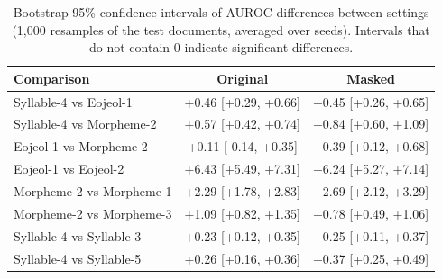 \begin{table}[t]
\centering
\small
\begin{tabular}{lcc}
\hline
\textbf{Comparison} & \textbf{Original} & \textbf{Masked} \\
\hline
Syllable-4 vs Eojeol-1 & +0.46 [+0.29, +0.66] & +0.45 [+0.26, +0.65] \\
Syllable-4 vs Morpheme-2 & +0.57 [+0.42, +0.74] & +0.84 [+0.60, +1.09] \\
Eojeol-1 vs Morpheme-2 & +0.11 [-0.14, +0.35] & +0.39 [+0.12, +0.68] \\
Eojeol-1 vs Eojeol-2 & +6.43 [+5.49, +7.31] & +6.24 [+5.27, +7.14] \\
Morpheme-2 vs Morpheme-1 & +2.29 [+1.78, +2.83] & +2.69 [+2.12, +3.29] \\
Morpheme-2 vs Morpheme-3 & +1.09 [+0.82, +1.35] & +0.78 [+0.49, +1.06] \\
Syllable-4 vs Syllable-3 & +0.23 [+0.12, +0.35] & +0.25 [+0.11, +0.37] \\
Syllable-4 vs Syllable-5 & +0.26 [+0.16, +0.36] & +0.37 [+0.25, +0.49] \\
\hline
\end{tabular}
\caption{Bootstrap 95\% confidence intervals of AUROC differences between settings (1,000 resamples of the test documents, averaged over seeds). Intervals that do not contain 0 indicate significant differences.}
\label{tab:bootstrap}
\end{table}


